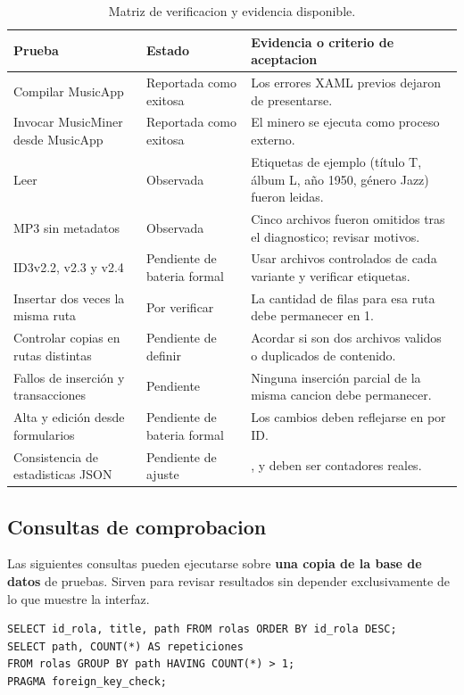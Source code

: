 \documentclass[11pt,a4paper,oneside]{article}
\newcommand{\file}[1]{\texttt{\detokenize{#1}}}
\newcommand{\code}[1]{\texttt{\detokenize{#1}}}
\begin{document}
\begin{table}[H]
\centering\small
\caption{Matriz de verificacion y evidencia disponible.}
\begin{tabularx}{\linewidth}{@{}p{4.3cm}p{2.65cm}X@{}}
\toprule
\textbf{Prueba} & \textbf{Estado} & \textbf{Evidencia o criterio de aceptacion}\\
\midrule
Compilar MusicApp & Reportada como exitosa & Los errores XAML previos dejaron de presentarse.\\
Invocar MusicMiner desde MusicApp & Reportada como exitosa & El minero se ejecuta como proceso externo.\\
Leer \file{demo.mp3} & Observada & Etiquetas de ejemplo (título T, álbum L, año 1950, género Jazz) fueron leidas.\\
MP3 sin metadatos & Observada & Cinco archivos fueron omitidos tras el diagnostico; revisar motivos.\\
ID3v2.2, v2.3 y v2.4 & Pendiente de bateria formal & Usar archivos controlados de cada variante y verificar etiquetas.\\
Insertar dos veces la misma ruta & Por verificar & La cantidad de filas para esa ruta debe permanecer en 1.\\
Controlar copias en rutas distintas & Pendiente de definir & Acordar si son dos archivos validos o duplicados de contenido.\\
Fallos de inserción y transacciones & Pendiente & Ninguna inserción parcial de la misma cancion debe permanecer.\\
Alta y edición desde formularios & Pendiente de bateria formal & Los cambios deben reflejarse en \code{SELECT} por ID.\\
Consistencia de estadisticas JSON & Pendiente de ajuste & \code{inserted}, \code{duplicates} y \code{failed} deben ser contadores reales.\\
\bottomrule
\end{tabularx}
\end{table}

\subsection{Consultas de comprobacion}
Las siguientes consultas pueden ejecutarse sobre \textbf{una copia de la base de datos} de pruebas. Sirven para revisar resultados sin depender exclusivamente de lo que muestre la interfaz.
\begin{lstlisting}[style=commands]
SELECT id_rola, title, path FROM rolas ORDER BY id_rola DESC;
SELECT path, COUNT(*) AS repeticiones
FROM rolas GROUP BY path HAVING COUNT(*) > 1;
PRAGMA foreign_key_check;
\end{lstlisting}
\end{document}
